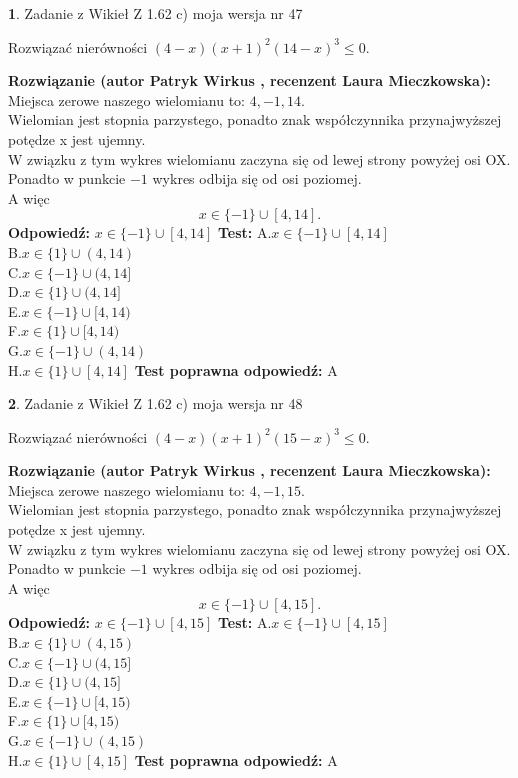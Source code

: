 \documentclass[12pt, a4paper]{article}
\theoremstyle{definition} %
\newtheorem{zad}{}
\newcommand{\zadStart}[1]{\begin{zad}#1\newline}
\newcommand{\zadStop}{\end{zad}}
\newcommand{\rozwStart}[2]{\noindent \textbf{Rozwiązanie (autor #1 , recenzent #2): }\newline}
\newcommand{\rozwStop}{\newline}
\newcommand{\odpStart}{\noindent \textbf{Odpowiedź:}\newline}
\newcommand{\odpStop}{\newline}
\newcommand{\testStart}{\noindent \textbf{Test:}\newline}
\newcommand{\testStop}{\newline}
\newcommand{\kluczStart}{\noindent \textbf{Test poprawna odpowiedź:}\newline}
\newcommand{\kluczStop}{\newline}
\begin{document}
\zadStart{Zadanie z Wikieł Z 1.62 c) moja wersja nr 47}

Rozwiązać nierówności $(4-x)(x+1)^{2}(14-x)^{3}\le0$.
\zadStop
\rozwStart{Patryk Wirkus}{Laura Mieczkowska}
Miejsca zerowe naszego wielomianu to: $4, -1, 14$.\\
Wielomian jest stopnia parzystego, ponadto znak współczynnika przy\linebreak najwyższej potędze x jest ujemny.\\ W związku z tym wykres wielomianu zaczyna się od lewej strony powyżej osi OX.\\
Ponadto w punkcie $-1$ wykres odbija się od osi poziomej.\\
A więc $$x \in \{-1\} \cup [4,14].$$
\rozwStop
\odpStart
$x \in \{-1\} \cup [4,14]$
\odpStop
\testStart
A.$x \in \{-1\} \cup [4,14]$\\
B.$x \in \{1\} \cup (4,14)$\\
C.$x \in \{-1\} \cup (4,14]$\\
D.$x \in \{1\} \cup (4,14]$\\
E.$x \in \{-1\} \cup [4,14)$\\
F.$x \in \{1\} \cup [4,14)$\\
G.$x \in \{-1\} \cup (4,14)$\\
H.$x \in \{1\} \cup [4,14]$
\testStop
\kluczStart
A
\kluczStop



\zadStart{Zadanie z Wikieł Z 1.62 c) moja wersja nr 48}

Rozwiązać nierówności $(4-x)(x+1)^{2}(15-x)^{3}\le0$.
\zadStop
\rozwStart{Patryk Wirkus}{Laura Mieczkowska}
Miejsca zerowe naszego wielomianu to: $4, -1, 15$.\\
Wielomian jest stopnia parzystego, ponadto znak współczynnika przy\linebreak najwyższej potędze x jest ujemny.\\ W związku z tym wykres wielomianu zaczyna się od lewej strony powyżej osi OX.\\
Ponadto w punkcie $-1$ wykres odbija się od osi poziomej.\\
A więc $$x \in \{-1\} \cup [4,15].$$
\rozwStop
\odpStart
$x \in \{-1\} \cup [4,15]$
\odpStop
\testStart
A.$x \in \{-1\} \cup [4,15]$\\
B.$x \in \{1\} \cup (4,15)$\\
C.$x \in \{-1\} \cup (4,15]$\\
D.$x \in \{1\} \cup (4,15]$\\
E.$x \in \{-1\} \cup [4,15)$\\
F.$x \in \{1\} \cup [4,15)$\\
G.$x \in \{-1\} \cup (4,15)$\\
H.$x \in \{1\} \cup [4,15]$
\testStop
\kluczStart
A
\kluczStop
\end{document}
